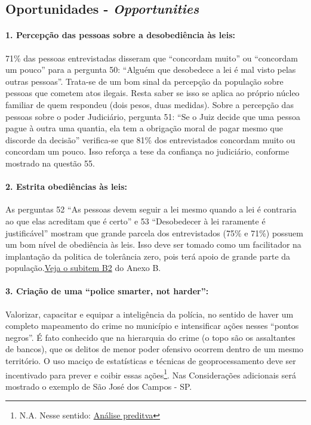 \documentclass[
	12pt,				%
	openright,			%
	twoside,			%
	a4paper,			%
	chapter=TITLE,		%
	section=TITLE,		%
	subsection=TITLE,	%
	subsubsection=TITLE,%
	spanish,            %
	english,			%
	brazil				%
	]{abntex2}
\begin{document}
\subsection{Oportunidades - \textit{Opportunities}}
\hypertarget{O1}{}
\paragraph*{\textbf{1. Percepção das pessoas sobre a desobediência às leis:}} 71\% das pessoas entrevistadas disseram que “concordam muito” ou “concordam um pouco”  para a pergunta 50: “Alguém que desobedece a lei é mal visto pelas outras pessoas”. Trata-se de um bom sinal da percepção da população sobre pessoas que cometem atos ilegais. Resta saber se isso se aplica ao próprio núcleo familiar de quem respondeu (dois pesos, duas medidas). Sobre a percepção das pessoas sobre o poder Judiciário, pergunta 51: “Se o Juiz decide que uma pessoa pague à outra uma quantia, ela tem a obrigação moral de pagar mesmo que discorde da decisão” verifica-se que 81\% dos entrevistados concordam muito ou concordam um pouco. Isso reforça a tese da confiança no judiciário, conforme mostrado na questão 55.
\hypertarget{O2}{}
\paragraph*{\textbf{2. Estrita obediências às leis:}}As perguntas 52 “As pessoas devem seguir a lei mesmo quando a lei é contraria ao que elas acreditam que é certo” e 53 “Desobedecer à lei raramente é justificável” mostram que grande parcela dos entrevistados (75\% e 71\%) possuem um bom nível de obediência às leis. Isso deve ser tomado como um facilitador na implantação da politica de tolerância zero, pois terá apoio de grande parte da população.\hyperlink{B2}{Veja o subitem B2} do Anexo B.
\hypertarget{O3}{}
\paragraph*{\textbf{3. Criação de uma “police smarter, not harder”:}} Valorizar, capacitar e equipar a inteligência da polícia, no sentido de haver um
completo mapeamento do crime no município e intensificar ações nesses “pontos negros”. É fato conhecido que na hierarquia do crime (o topo são
os assaltantes de bancos), que os delitos de menor poder ofensivo ocorrem dentro de um mesmo território. O uso maciço de estatísticas e
técnicas de geoprocessamento deve ser incentivado para prever e coibir essas ações\footnote{N.A. Nesse sentido: \href{http://www.ibm.com/smarterplanet/us/en/leadership/memphispd/assets/pdf/IBM_MemphisPD.pdf}{Análise preditva}}. Nas Considerações adicionais será mostrado o exemplo de São José dos Campos - SP.
\hypertarget{O4}{}
\end{document}
